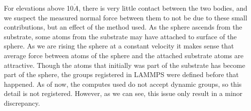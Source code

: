 \documentclass[twoside,english]{uiofysmaster}
\begin{document}
For elevations above 10$\mathring{A}$, there is very little contact between the two bodies, and we suspect the measured normal force between them to not be due to these small contributions, but an effect of the method used. 
As the sphere ascends from the substrate, some atoms from the substrate may have attached to surface of the sphere. 
As we are rising the sphere at a constant velocity it makes sense that average force between atoms of the sphere and the attached substrate atoms are attractive. 
Though the atoms that initially was part of the substrate has become part of the sphere, the groups registered in LAMMPS were defined before that happened. 
As of now, the computes used do not accept dynamic groups, so this detail is not registered. 
However, as we can see, this issue only result in a minor discrepancy. 
\end{document}
